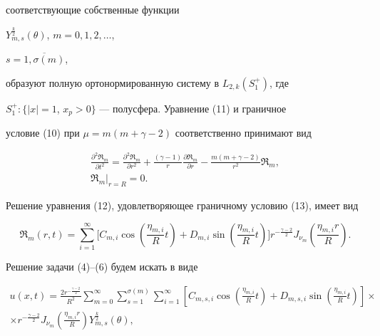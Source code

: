 соответствующие собственные функции  


$Y_{m,s}^{\frac{k}{2}}(\theta)$, $m=0,1,2,\dotsc$,


$s=\overline{1,\sigma(m)}$,


образуют полную ортонормированную систему в $L_{2,k}(S_{1}^{+})$, где 


$S^{+}_{1}:\{ |x|=1$, $x_{p}>0\}$ --- полусфера. Уравнение (11) и граничное 


условие (10) при $\mu=m(m+\gamma-2)$ соответственно принимают вид


\begin{gather}


\frac{\partial^2\Re_{m}}{\partial t^2}=\frac{\partial^{2}\Re_{m}}


{\partial r^{2}}+\frac{(\gamma-1)}{r}\frac{\partial\Re_{m}}{\partial r}-


\frac{m(m+\gamma-2)}{r^{2}}\Re_{m}, \\


%


\Re_{m}\big|_{r=R}=0.


\end{gather}


Решение уравнения (12), удовлетворяющее граничному условию (13), имеет вид


$$


\Re_{m}(r,t)=\sum^{\infty}_{i=1}\bigg[ C_{m,i}\cos\left(\frac{\eta_{m,i}}


{R}t\right)+D_{m,i}\sin\left(\frac{\eta_{m,i}}{R}t\right)\bigg]r^{-\frac


{\gamma-2}{2}}J_{\nu_m}\left(\frac{\eta_{m,i}r}{R}\right).


$$





Решение задачи (4)--(6) будем искать в виде 


\begin{multline}


u(x,t)=\frac{2r^{-\frac{\gamma-2}{2}}}{R^{2}}\sum\limits^{\infty}_{m=0}


\sum\limits^{\sigma(m)}_{s=1}\sum\limits^{\infty}_{i=1}\left [ C_{m,s,i}


\cos\left(\frac{\eta_{m,i}}


{R}t\right)+D_{m,s,i} \sin\left(\frac{\eta_{m,i}}


{R}t\right)\right] \times \\ \times


r^{-\frac{\gamma-2}{2}}J_{\nu_{m}} \left( \frac{\eta_{m,i}r}{R}


\right)Y^{\frac{k}{2}}_{m,s}(\theta),


\end{multline}


